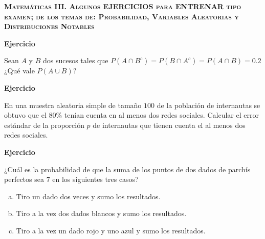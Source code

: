 \documentclass[12pt,spanish,es-nodecimaldot]{article}\usepackage[]{graphicx}\usepackage[]{color}
\newcounter{problemes}
\newcounter{punts} \def\thepunts{\arabic{punts}}
\def\probl{\textbf{\newline\noindent\hspace{-1cm} Ejercicio}\addtocounter{problemes}{1} \setcounter{punts}{0}
\medskip\noindent{\bf \theproblemes) }}
\newif\ifsol
\begin{document}
\setcounter{problemes}{0}

\begin{center}
\textsc{\textbf{Matemáticas III. Algunos EJERCICIOS para ENTRENAR tipo examen; de los temas de: Probabilidad, Variables Aleatorias y Distribuciones Notables}}\\[1ex]%
\end{center}



\probl Sean $A$ y $B$ dos sucesos tales que $P(A\cap B^c)=P(B\cap A^c)=P(A\cap B)=0.2$  ¿Qué vale $P(A\cup B)$?
\ifsol

\textbf{Solución:}
Tenemos que  $P(A\cap B^c)=P(A-B)=P(A)-P(A\cap B)=0.2$  y también  $P(B\cap A^c)=P(B-A)=P(B)-P(A\cap B)=0.2$.
 De donde, utilizando que $P(A\cap B)=0.2$ tenemos que $P(A)=P(B)=0.4$. Y ahora calculamos lo que se pide
 $$P(A\cup B)=P(A)+P(B)-P(A\cap B)=0.4+0.4-0.2=0.6.$$

\else
\fi

\probl En una muestra aleatoria simple de tamaño $100$ de la población de internautas  se obtuvo que el 80\% tenían cuenta en al menos dos redes sociales. Calcular el error estándar de la proporción $p$ de internautas que tienen  cuenta el al menos dos redes sociales.
\ifsol

\textbf{Solución:}



Tenemos una muestra aleatoria simple de tamaño $n=100$ en la que la proporción muestral es $\hat{p}=0.8$. Bajo estas condiciones el error estándar del estadístico $\hat{p}$ es 

$$\sqrt{\frac{\hat{p}\cdot (1- \hat{p})}{n}}=\sqrt{\frac{0.8\cdot (0.2)}{100}}=
0.04.$$
\else
\fi

\probl  ¿Cuál es la probabilidad de que la suma de  los puntos de  dos dados  de parchís perfectos sea $7$ en los siguientes tres  casos?

\begin{enumerate}[a)]
\item Tiro un dado dos veces y sumo los resultados.
\item Tiro a la  vez dos dados  blancos y sumo los resultados.
\item Tiro a la vez un  dado rojo y uno azul y sumo los resultados.
\end{enumerate}
\ifsol
\end{document}
